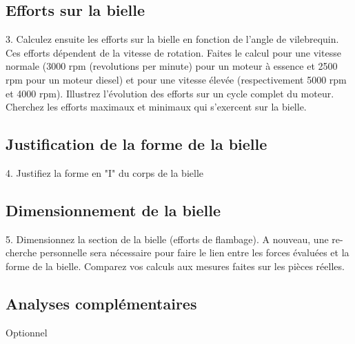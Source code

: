 \documentclass[a4paper,oneside,12pt]{report}
\begin{document}
\subsection{Efforts sur la bielle}
3. Calculez ensuite les efforts sur la bielle en fonction de l’angle de vilebrequin.
Ces efforts dépendent de la vitesse de rotation. Faites le calcul pour une vitesse
normale (3000 rpm (revolutions per minute) pour un moteur à essence et 2500
rpm pour un moteur diesel) et pour une vitesse élevée (respectivement 5000 rpm
et 4000 rpm). Illustrez l’évolution des efforts sur un cycle complet du moteur.
Cherchez les efforts maximaux et minimaux qui s’exercent sur la bielle.

\subsection{Justification de la forme de la bielle}
4. Justifiez la forme en "I" du corps de la bielle

\subsection{Dimensionnement de la bielle}
5. Dimensionnez la section de la bielle (efforts de flambage). A nouveau, une re-
cherche personnelle sera nécessaire pour faire le lien entre les forces évaluées
et la forme de la bielle. Comparez vos calculs aux mesures faites sur les pièces
réelles.

\subsection{Analyses complémentaires}
Optionnel
\end{document}
